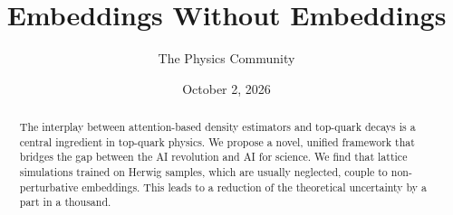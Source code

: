 \documentclass[11pt]{article}
\title{Embeddings Without Embeddings}
\author{The Physics Community}
\date{October 2, 2026}
\numberwithin{equation}{section}
\theoremstyle{definition}
\theoremstyle{remark}
\begin{document}
\maketitle
\begin{abstract}
The interplay between attention-based density estimators and top-quark
decays is a central ingredient in top-quark physics. We propose a novel,
unified framework that bridges the gap between the AI revolution and AI
for science. We find that lattice simulations trained on Herwig samples,
which are usually neglected, couple to non-perturbative embeddings. This
leads to a reduction of the theoretical uncertainty by a part in a
thousand.
\end{abstract}
\tableofcontents





\nocite{*}


\end{document}
